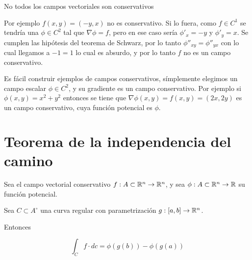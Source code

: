 \begin{example}{No todos los campos vectoriales son conservativos}

Por ejemplo $f(x,y) = (-y, x)$ no es conservativo.  Si lo fuera, como $f \in C^1$ se tendría una $ \phi \in C^2$ tal que $ \nabla \phi = f$, pero en ese caso sería $\phi'_x = -y$ y $\phi'_y = x$.  Se cumplen las hipótesis del teorema de Schwarz, por lo tanto $ \phi''_{xy} = \phi''_{yx}$ con lo cual llegamos a $ -1 = 1$ lo cual es absurdo, y por lo tanto $f$ no es un campo conservativo.
\end{example}

Es fácil construir ejemplos de campos conservativos, símplemente elegimos un campo escalar $ \phi \in C^2$, y su gradiente es un campo conservativo.  Por ejemplo si $\phi(x,y) = x^2 + y^2$ entonces se tiene que $\nabla \phi(x,y) = f(x,y) = (2x, 2y)$ es un campo conservativo, cuya función potencial es $\phi$.

\section{Teorema de la independencia del camino}

\begin{theorem} 
Sea el campo vectorial conservativo $f : A \subset \mathbb{R}^n \to \mathbb{R}^n$, y sea $ \phi : A \subset \mathbb{R}^n \to \mathbb{R}$ su función potencial. 

Sea $ C \subset A^{\circ}$ una curva regular con parametrización $ g:[a,b] \to \mathbb{R}^n$.

Entonces 

$$ \int_C f \cdot dc = \phi(g(b)) - \phi(g(a)) $$
\end{theorem}

